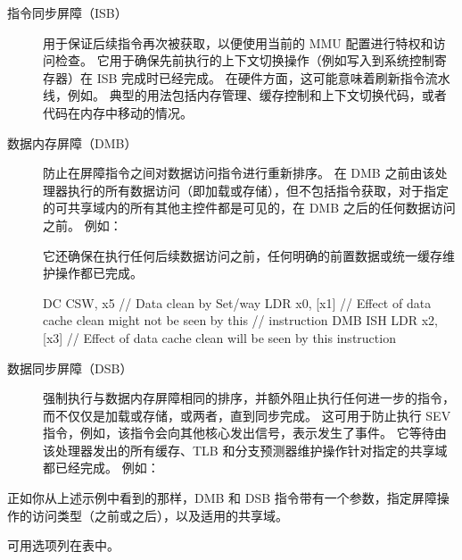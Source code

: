 \begin{description}
  \item [指令同步屏障（ISB）] 用于保证后续指令再次被获取，以便使用当前的 MMU 配置进行特权和访问检查。
  它用于确保先前执行的上下文切换操作（例如写入到系统控制寄存器）在 ISB 完成时已经完成。
  在硬件方面，这可能意味着刷新指令流水线，例如。
  典型的用法包括内存管理、缓存控制和上下文切换代码，或者代码在内存中移动的情况。
  \item [数据内存屏障（DMB）] 防止在屏障指令之间对数据访问指令进行重新排序。
  在 DMB 之前由该处理器执行的所有数据访问（即加载或存储），但不包括指令获取，对于指定的可共享域内的所有其他主控件都是可见的，在 DMB 之后的任何数据访问之前。
    例如：

    它还确保在执行任何后续数据访问之前，任何明确的前置数据或统一缓存维护操作都已完成。

    \begin{lstcode}
      DC CSW, x5   // Data clean by Set/way
      LDR x0, [x1] // Effect of data cache clean might not be seen by this
                   // instruction
      DMB ISH
      LDR x2, [x3] // Effect of data cache clean will be seen by this
      instruction
    \end{lstcode}
  \item [数据同步屏障（DSB）] 强制执行与数据内存屏障相同的排序，并额外阻止执行任何进一步的指令，而不仅仅是加载或存储，或两者，直到同步完成。
  这可用于防止执行 SEV 指令，例如，该指令会向其他核心发出信号，表示发生了事件。
  它等待由该处理器发出的所有缓存、TLB 和分支预测器维护操作针对指定的共享域都已经完成。
    例如：
\end{description}

正如你从上述示例中看到的那样，DMB 和 DSB 指令带有一个参数，指定屏障操作的访问类型（之前或之后），以及适用的共享域。

可用选项列在表中。

